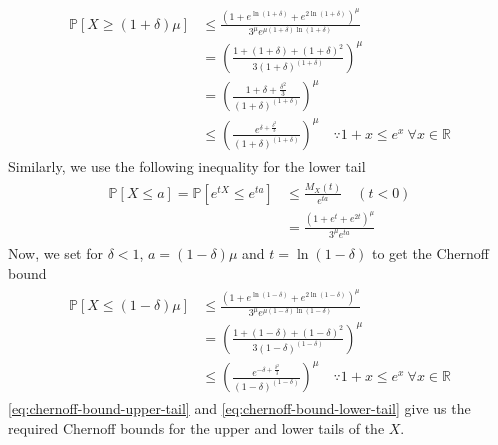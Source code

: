 \documentclass[9pt]{article}
\newcommand{\Probability}[1]{\mathbb{P}\left[ #1 \right]}
\begin{document}
\begin{align}
    \label{eq:chernoff-bound-upper-tail}
    \begin{split}
        \Probability{X \geq (1 + \delta) \mu}
        &\leq \frac{\left( 1 + e^{\ln{(1 + \delta)}} + e^{2 \ln{(1 + \delta)}} \right)^{\mu}}
        {3^{\mu} e^{\mu (1 + \delta) \ln{(1 + \delta)}}} \\
        &= \left( \frac{1 + (1 + \delta) + (1 + \delta)^{2}}{3 (1 + \delta)^{(1 + \delta)}} \right)^{\mu} \\
        &= \left( \frac{1 + \delta + \frac{\delta^{2}}{3}}{(1 + \delta)^{(1 + \delta)}} \right)^{\mu} \\
        &\leq \left( \frac{e^{\delta + \frac{\delta^{2}}{3}}}{(1 + \delta)^{(1 + \delta)}} \right)^{\mu}
        \quad \because 1 + x \leq e^{x} \ \forall x \in \mathbb{R}
    \end{split}
\end{align}
Similarly, we use the following inequality for the lower tail
\begin{align}
    \begin{split}
        \Probability{X \leq a} = \Probability{e^{tX} \leq e^{ta}} &\leq \frac{M_{X}(t)}{e^{ta}} \quad (t < 0) \\
        &= \frac{\left( 1 + e^{t} + e^{2t} \right)^{\mu}}{3^{\mu} e^{ta}}
    \end{split}
\end{align}
Now, we set for $\delta < 1$, $a = (1 - \delta) \mu$ and $t = \ln{(1 - \delta)}$ to get the Chernoff bound
\begin{align}
    \label{eq:chernoff-bound-lower-tail}
    \begin{split}
        \Probability{X \leq (1 - \delta) \mu}
        &\leq \frac{\left( 1 + e^{\ln{(1 - \delta)}} + e^{2 \ln{(1 - \delta)}} \right)^{\mu}}
        {3^{\mu} e^{\mu (1 - \delta) \ln{(1 - \delta)}}} \\
        &= \left( \frac{1 + (1 - \delta) + (1 - \delta)^{2}}{3 (1 - \delta)^{(1 - \delta)}} \right)^{\mu} \\
        &\leq \left( \frac{e^{-\delta + \frac{\delta^{2}}{3}}}{(1 - \delta)^{(1 - \delta)}} \right)^{\mu}
        \quad \because 1 + x \leq e^{x} \ \forall x \in \mathbb{R}
    \end{split}
\end{align}
\eqref{eq:chernoff-bound-upper-tail} and \eqref{eq:chernoff-bound-lower-tail} give us the
required Chernoff bounds for the upper and lower tails of the $X$.
\end{document}
